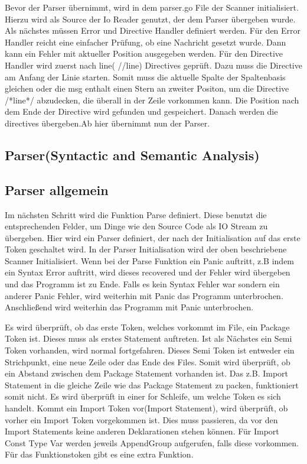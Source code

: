 Bevor der Parser übernimmt, wird in dem parser.go File der Scanner initialisiert. Hierzu wird als Source der Io Reader genutzt, der dem Parser übergeben wurde. Als nächstes müssen Error und Directive Handler definiert werden. Für den Error Handler reicht eine einfacher Prüfung, ob eine Nachricht gesetzt wurde. Dann kann ein Fehler mit aktueller Position ausgegeben werden. Für den Directive Handler wird zuerst nach line( //line) Directives geprüft. Dazu muss die Directive am Anfang der Linie starten. Somit muss die aktuelle Spalte der Spaltenbasis gleichen oder die msg enthalt einen Stern an zweiter Positon, um die Directive /*line*/ abzudecken, die überall in der Zeile vorkommen kann. Die Position nach dem Ende der Directive wird gefunden und gespeichert. 
Danach werden die directives übergeben.Ab hier übernimmt nun der Parser.

\subsection{Parser(Syntactic and Semantic Analysis)}
\subsection{Parser allgemein}
Im nächsten Schritt wird die Funktion Parse definiert. Diese benutzt die entsprechenden Felder, um Dinge wie den Source Code als IO Stream zu übergeben. Hier wird ein Parser definiert, der nach der Initialisation auf das erste Token geschaltet wird.
In der Parser Initialisation wird der oben beschriebene Scanner Initialisiert. Wenn bei der Parse Funktion ein Panic auftritt, z.B indem ein Syntax Error auftritt, wird dieses recovered und der Fehler wird übergeben und das Programm ist zu Ende. Falls es kein Syntax Fehler war sondern ein anderer Panic Fehler, wird weiterhin mit Panic das Programm unterbrochen. Anschließend wird weiterhin das Programm mit Panic unterbrochen.

Es wird überprüft, ob das erste Token, welches vorkommt im File, ein Package Token ist. Dieses muss als erstes Statement auftreten.
Ist als Nächstes ein Semi Token vorhanden, wird normal fortgefahren. Dieses Semi Token ist entweder ein Strichpunkt, eine neue Zeile oder das Ende des Files. Somit wird überprüft, ob ein Abstand zwischen dem Package Statement vorhanden ist. Das z.B. Import Statement in die gleiche Zeile wie das Package Statement zu packen, funktioniert somit nicht.
Es wird überprüft in einer for Schleife, um welche Token es sich handelt. Kommt ein Import Token vor(Import Statement), wird überprüft, ob vorher ein Import Token vorgekommen ist. Dies muss passieren, da vor den Import Statements keine anderen Deklarationen stehen können. Für Import Const Type Var werden jeweils AppendGroup aufgerufen, falls diese vorkommen. Für das Funktionstoken gibt es eine extra Funktion. 

